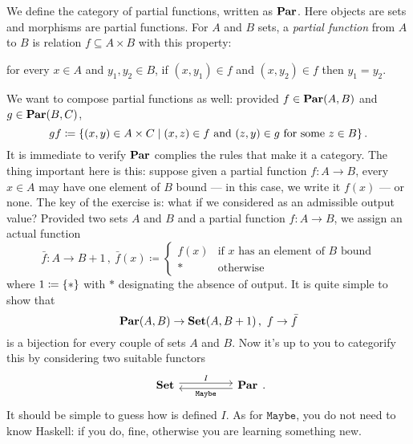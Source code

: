 
\begin{exercise}
 We define the category of partial functions, written as \(\mathbf{Par}\). Here objects are sets and morphisms are partial functions. For \(A\) and \(B\) sets, a {\em partial function} from \(A\) to \(B\) is relation \(f \subseteq A \times B\) with this property:
\begin{center}
for every \(x \in A\) and \(y_1, y_2 \in B\), if \((x, y_1) \in f\) and \((x, y_2) \in f\) then \(y_1 = y_2\).
\end{center}
We want to compose partial functions as well: provided \(f \in \mathbf{Par}(A, B)\) and \(g \in \mathbf{Par}(B, C)\),
\[gf \coloneq \left\{(x, y) \in A \times C \mid (x, z) \in f \text{ and } (z, y) \in g \text{ for some } z \in B\right\} .\]
It is immediate to verify \(\mathbf{Par}\) complies the rules that make it a category.\newline
The thing important here is this: suppose given a partial function \(f : A \to B\), every \(x \in A\) may have one element of \(B\) bound --- in this case, we write it \(f(x)\) --- or none. The key of the exercise is: what if we considered  as an admissible output value? Provided two sets \(A\) and \(B\) and a partial function \(f : A \to B\), we assign an actual function
\[\bar f : A \to B+1 \,, \ \bar f(x) \coloneq \begin{cases} f(x) & \text{if \(x\) has an element of \(B\) bound} \\ \ast & \text{otherwise} \end{cases}\]
where \(1 \coloneq \left\{\ast\right\}\) with \(\ast\) designating the absence of output. It is quite simple to show that
\[\mathbf{Par}(A, B) \to \mathbf{Set}(A, B+1)\,,\ f \to \bar f\]
is a bijection for every couple of sets \(A\) and \(B\). Now it's up to you to categorify this by considering two suitable functors
\[\begin{tikzcd}
\Set \ar["I", rr, shift left] & & \Par \ar["{\mathtt{Maybe}}", ll, shift left]
\end{tikzcd}.\]
It should be simple to guess how is defined \(I\). As for \(\mathtt{Maybe}\), you do not need to know Haskell: if you do, fine, otherwise you are learning something new.
\end{exercise}

